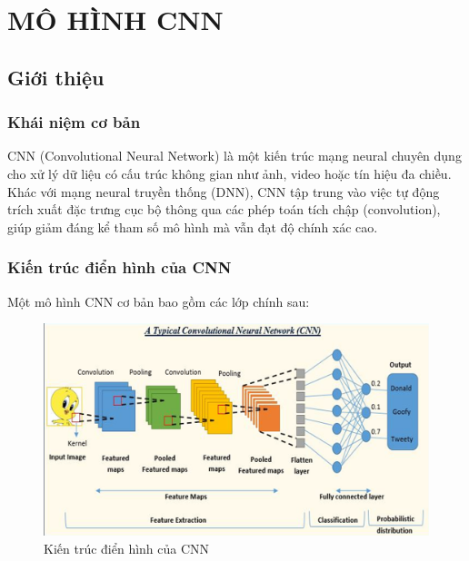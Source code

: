 \section{MÔ HÌNH CNN}
\subsection{Giới thiệu}
\subsubsection{Khái niệm cơ bản}
CNN (Convolutional Neural Network) là một kiến trúc mạng neural chuyên dụng cho xử lý dữ liệu có cấu trúc không gian như ảnh, video hoặc tín hiệu đa chiều. Khác với mạng neural truyền thống (DNN), CNN tập trung vào việc tự động trích xuất đặc trưng cục bộ thông qua các phép toán tích chập (convolution), giúp giảm đáng kể tham số mô hình mà vẫn đạt độ chính xác cao.
\subsubsection{Kiến trúc điển hình của CNN}

Một mô hình CNN cơ bản bao gồm các lớp chính sau:
\begin{figure}[H]
    \centering
    \includegraphics[width=0.9\linewidth]{Images/cnnarchi.png}
    \caption{Kiến trúc điển hình của CNN}
    \label{fig:enter-label}
\end{figure}

